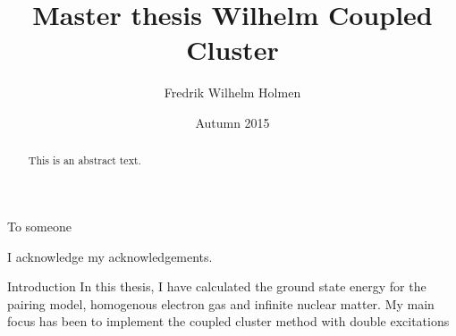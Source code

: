 \documentclass[twoside,english]{uiofysmaster}
\author{Fredrik Wilhelm Holmen}
\title{Master thesis Wilhelm Coupled Cluster}
\date{Autumn 2015}
\begin{document}
\setlength{\belowdisplayskip}{12pt} \setlength{\belowdisplayshortskip}{12pt}
\setlength{\abovedisplayskip}{12pt} \setlength{\abovedisplayshortskip}{12pt}


\maketitle

\begin{abstract}
	This is an abstract text.
\end{abstract}

\begin{dedication}
	To someone
	\\\vspace{12pt}
  
\end{dedication}

\begin{acknowledgements}
	I acknowledge my acknowledgements.
\end{acknowledgements}


\tableofcontents


\begin{chapter}{Introduction}
	In this thesis, I have calculated the ground state energy for the pairing model, homogenous electron gas and infinite nuclear matter. My main focus has been to implement the coupled cluster method with double excitations 
\end{chapter}
\end{document}
